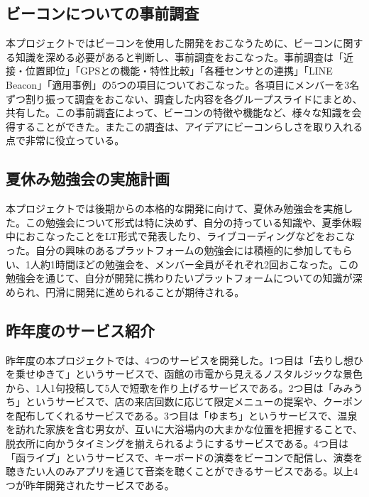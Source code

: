 
\subsection{ビーコンについての事前調査}
本プロジェクトではビーコンを使用した開発をおこなうために、ビーコンに関する知識を深める必要があると判断し、事前調査をおこなった。事前調査は「近接・位置即位」「GPSとの機能・特性比較」「各種センサとの連携」「LINE Beacon」「適用事例」の5つの項目についておこなった。各項目にメンバーを3名ずつ割り振って調査をおこない、調査した内容を各グループスライドにまとめ、共有した。この事前調査によって、ビーコンの特徴や機能など、様々な知識を会得することができた。またこの調査は、アイデアにビーコンらしさを取り入れる点で非常に役立っている。

\subsection{夏休み勉強会の実施計画}
本プロジェクトでは後期からの本格的な開発に向けて、夏休み勉強会を実施した。この勉強会について形式は特に決めず、自分の持っている知識や、夏季休暇中におこなったことをLT形式で発表したり、ライブコーディングなどをおこなった。自分の興味のあるプラットフォームの勉強会には積極的に参加してもらい、1人約1時間ほどの勉強会を、メンバー全員がそれぞれ2回おこなった。この勉強会を通じて、自分が開発に携わりたいプラットフォームについての知識が深められ、円滑に開発に進められることが期待される。

\subsection{昨年度のサービス紹介}
昨年度の本プロジェクトでは、4つのサービスを開発した。1つ目は「去りし想ひを乗せゆきて」というサービスで、函館の市電から見えるノスタルジックな景色から、1人1句投稿して5人で短歌を作り上げるサービスである。2つ目は「みみうち」というサービスで、店の来店回数に応じて限定メニューの提案や、クーポンを配布してくれるサービスである。3つ目は「ゆまち」というサービスで、温泉を訪れた家族を含む男女が、互いに大浴場内の大まかな位置を把握することで、脱衣所に向かうタイミングを揃えられるようにするサービスである。4つ目は「函ライブ」というサービスで、キーボードの演奏をビーコンで配信し、演奏を聴きたい人のみアプリを通じて音楽を聴くことができるサービスである。以上4つが昨年開発されたサービスである。
